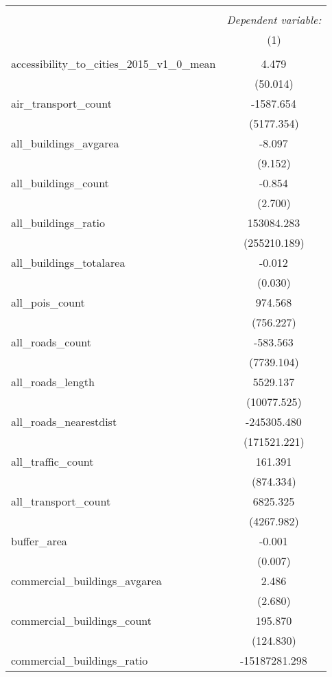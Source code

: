 \begin{table}[!htbp] \centering
\begin{tabular}{@{\extracolsep{5pt}}lc}
\\[-1.8ex]\hline
\hline \\[-1.8ex]
& \multicolumn{1}{c}{\textit{Dependent variable:}} \
\cr \cline{1-2}
\\[-1.8ex] & (1) \\
\hline \\[-1.8ex]
 accessibility_to_cities_2015_v1_0_mean & 4.479$^{}$ \\
  & (50.014) \\
 air_transport_count & -1587.654$^{}$ \\
  & (5177.354) \\
 all_buildings_avgarea & -8.097$^{}$ \\
  & (9.152) \\
 all_buildings_count & -0.854$^{}$ \\
  & (2.700) \\
 all_buildings_ratio & 153084.283$^{}$ \\
  & (255210.189) \\
 all_buildings_totalarea & -0.012$^{}$ \\
  & (0.030) \\
 all_pois_count & 974.568$^{}$ \\
  & (756.227) \\
 all_roads_count & -583.563$^{}$ \\
  & (7739.104) \\
 all_roads_length & 5529.137$^{}$ \\
  & (10077.525) \\
 all_roads_nearestdist & -245305.480$^{}$ \\
  & (171521.221) \\
 all_traffic_count & 161.391$^{}$ \\
  & (874.334) \\
 all_transport_count & 6825.325$^{}$ \\
  & (4267.982) \\
 buffer_area & -0.001$^{}$ \\
  & (0.007) \\
 commercial_buildings_avgarea & 2.486$^{}$ \\
  & (2.680) \\
 commercial_buildings_count & 195.870$^{}$ \\
  & (124.830) \\
 commercial_buildings_ratio & -15187281.298$^{}$ \\

\end{tabular}
\end{table}
